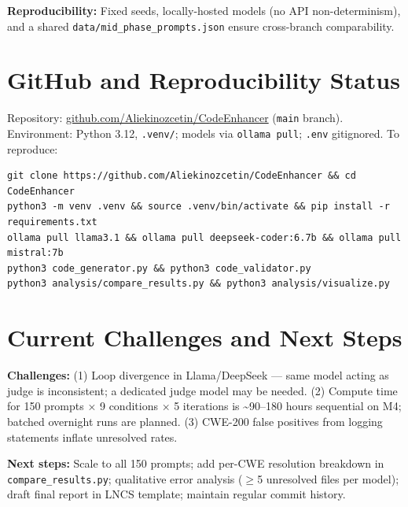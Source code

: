 \documentclass[10pt,a4paper]{article}
\begin{document}
\textbf{Reproducibility:} Fixed seeds, locally-hosted models (no API non-determinism), and a shared \texttt{data/mid\_phase\_prompts.json} ensure cross-branch comparability.

\section{GitHub and Reproducibility Status}

Repository: \href{https://github.com/Aliekinozcetin/CodeEnhancer}{github.com/Aliekinozcetin/CodeEnhancer} (\texttt{main} branch). Environment: Python 3.12, \texttt{.venv/}; models via \texttt{ollama pull}; \texttt{.env} gitignored. To reproduce:

\begin{verbatim}
git clone https://github.com/Aliekinozcetin/CodeEnhancer && cd CodeEnhancer
python3 -m venv .venv && source .venv/bin/activate && pip install -r requirements.txt
ollama pull llama3.1 && ollama pull deepseek-coder:6.7b && ollama pull mistral:7b
python3 code_generator.py && python3 code_validator.py
python3 analysis/compare_results.py && python3 analysis/visualize.py
\end{verbatim}

\section{Current Challenges and Next Steps}

\textbf{Challenges:} (1) Loop divergence in Llama/DeepSeek — same model acting as judge is inconsistent; a dedicated judge model may be needed. (2) Compute time for 150 prompts × 9 conditions × 5 iterations is \textasciitilde{}90–180 hours sequential on M4; batched overnight runs are planned. (3) CWE-200 false positives from logging statements inflate unresolved rates.

\textbf{Next steps:} Scale to all 150 prompts; add per-CWE resolution breakdown in \texttt{compare\_results.py}; qualitative error analysis ($\geq$5 unresolved files per model); draft final report in LNCS template; maintain regular commit history.
\end{document}

